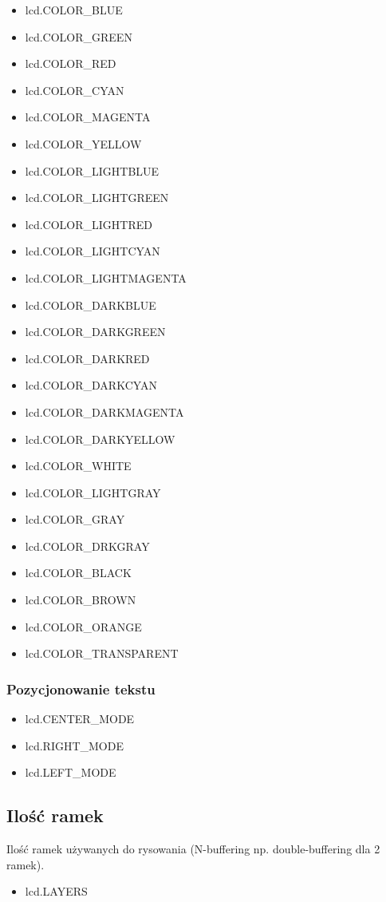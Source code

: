\documentclass{article}
\begin{document}
\begin{itemize}
  \item lcd.COLOR\_BLUE
  \item lcd.COLOR\_GREEN
  \item lcd.COLOR\_RED
  \item lcd.COLOR\_CYAN
  \item lcd.COLOR\_MAGENTA
  \item lcd.COLOR\_YELLOW
  \item lcd.COLOR\_LIGHTBLUE
  \item lcd.COLOR\_LIGHTGREEN
  \item lcd.COLOR\_LIGHTRED
  \item lcd.COLOR\_LIGHTCYAN
  \item lcd.COLOR\_LIGHTMAGENTA
  \item lcd.COLOR\_DARKBLUE
  \item lcd.COLOR\_DARKGREEN
  \item lcd.COLOR\_DARKRED
  \item lcd.COLOR\_DARKCYAN
  \item lcd.COLOR\_DARKMAGENTA
  \item lcd.COLOR\_DARKYELLOW
  \item lcd.COLOR\_WHITE
  \item lcd.COLOR\_LIGHTGRAY
  \item lcd.COLOR\_GRAY
  \item lcd.COLOR\_DRKGRAY   
  \item lcd.COLOR\_BLACK
  \item lcd.COLOR\_BROWN
  \item lcd.COLOR\_ORANGE
  \item lcd.COLOR\_TRANSPARENT
\end{itemize}

\subsubsection{Pozycjonowanie tekstu}

\begin{itemize}
  \item lcd.CENTER\_MODE
  \item lcd.RIGHT\_MODE
  \item lcd.LEFT\_MODE
\end{itemize}

\subsection{Ilość ramek}
Ilość ramek używanych do rysowania (N-buffering np. double-buffering dla 2 ramek).
\begin{itemize}
  \item lcd.LAYERS
\end{itemize}
\end{document}
